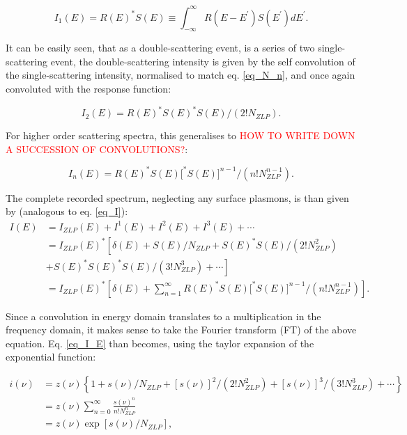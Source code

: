 \begin{equation} \label{eq_I_1}
    I_{1}(E)=R(E)^{*} S(E) \equiv \int_{-\infty}^{\infty} R\left(E-E^{\prime}\right) S\left(E^{\prime}\right) d E^{\prime}.
\end{equation}


It can be easily seen, that as a double-scattering event, is a series of two single-scattering event, the double-scattering intensity is given by the self convolution of the single-scattering intensity, normalised to match eq. \eqref{eq_N_n}, and once again convoluted with the response function:

\begin{equation}
    I_{2}(E)=R(E)^{*} S(E)^{*} S(E) /\left(2 ! N_{ZLP}\right).
\end{equation}

For higher order scattering spectra, this generalises to \textcolor{red}{HOW TO WRITE DOWN A SUCCESSION OF CONVOLUTIONS?}:


\begin{equation}
    I_{n}(E)=R(E)^{*} S(E)\big[^{*} S(E)\big]^{n-1} /\left(n ! N_{ZLP}^{n-1}\right).
\end{equation}

The complete recorded spectrum, neglecting any surface plasmons, is than given by (analogous to eq. \eqref{eq_I}):
\begin{equation} \label{eq_I_E}
    \begin{aligned}
        I(E) &=I_{ZLP}(E)+I^{1}(E)+I^{2}(E)+I^{3}(E)+\cdots \\
        &=I_{ZLP}(E)^{*}\left[\delta(E)+S(E) / N_{ZLP}+S(E)^{*} S(E) /\left(2 ! N_{ZLP}^{2}\right)\right.\\
        &\left.+S(E)^{*} S(E)^{*} S(E) /\left(3 ! N_{ZLP}^{3}\right)+\cdots\right]\\
        &= I_{ZLP}(E)^{*}\left[\delta(E)+ \sum_{n=1}^\infty R(E)^{*} S(E)\big[^{*} S(E)\big]^{n-1} /\left(n ! N_{ZLP}^{n-1}\right) \right].
        \end{aligned}
\end{equation}

Since a convolution in energy domain translates to a multiplication in the frequency domain, it makes sense to take the Fourier transform (FT) of the above equation. Eq. \eqref{eq_I_E} than becomes, using the taylor expansion of the exponential function:

\begin{equation}\label{eq_i_nu_exp}
    \begin{aligned}
i(\nu) &=z(\nu)\left\{1+s(\nu) / N_{ZLP}+[s(\nu)]^{2} /\left(2 ! N_{ZLP}^{2}\right)+[s(\nu)]^{3} /\left(3 ! N_{ZLP}^{3}\right)+\cdots\right\} \\
&=z(\nu)\sum_{n=0}^\infty\frac{s(\nu)^n}{n! N_{ZLP}^n}\\
&=z(\nu) \exp \left[s(\nu) / N_{ZLP}\right],
\end{aligned}
\end{equation}

